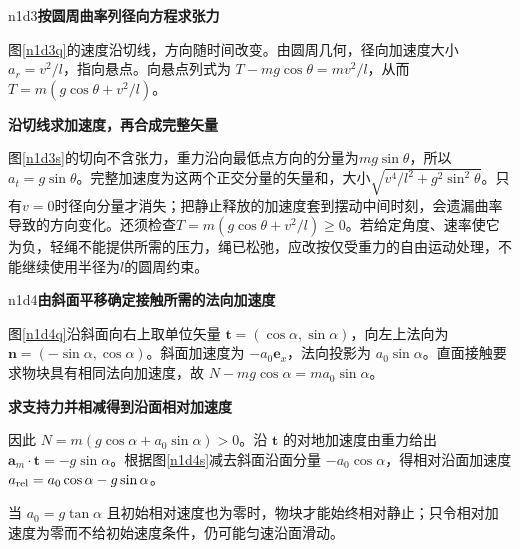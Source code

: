 \begin{drillsolution}{n1d3}\textbf{按圆周曲率列径向方程求张力}\par\nobreak
图\ref{n1d3q}的速度沿切线，方向随时间改变。由圆周几何，径向加速度大小 $a_r=v^2/l$，指向悬点。向悬点列式为 $T-mg\cos\theta=mv^2/l$，从而 $T=m(g\cos\theta+v^2/l)$。


\par\medskip{}\noindent\textbf{沿切线求加速度，再合成完整矢量}\par\nobreak
图\ref{n1d3s}的切向不含张力，重力沿向最低点方向的分量为$mg\sin\theta$，所以$a_t=g\sin\theta$。完整加速度为这两个正交分量的矢量和，大小$\sqrt{v^4/l^2+g^2\sin^2\theta}$。只有$v=0$时径向分量才消失；把静止释放的加速度套到摆动中间时刻，会遗漏曲率导致的方向变化。还须检查$T=m(g\cos\theta+v^2/l)\ge0$。若给定角度、速率使它为负，轻绳不能提供所需的压力，绳已松弛，应改按仅受重力的自由运动处理，不能继续使用半径为$l$的圆周约束。
\end{drillsolution}

\begin{drillsolution}{n1d4}\textbf{由斜面平移确定接触所需的法向加速度}\par\nobreak
图\ref{n1d4q}沿斜面向右上取单位矢量 $\bm t=(\cos\alpha,\sin\alpha)$，向左上法向为 $\bm n=(-\sin\alpha,\cos\alpha)$。斜面加速度为 $-a_0\bm e_x$，法向投影为 $a_0\sin\alpha$。直面接触要求物块具有相同法向加速度，故 $N-mg\cos\alpha=ma_0\sin\alpha$。


\par\medskip{}\noindent\textbf{求支持力并相减得到沿面相对加速度}\par\nobreak
因此 $N=m(g\cos\alpha+a_0\sin\alpha)>0$。沿 $\bm t$ 的对地加速度由重力给出 $\bm a_m\cdot\bm t=-g\sin\alpha$。根据图\ref{n1d4s}减去斜面沿面分量 $-a_0\cos\alpha$，得相对沿面加速度 $a_{\rm rel}=a_0\cos\alpha-g\sin\alpha$。

当 $a_0=g\tan\alpha$ 且初始相对速度也为零时，物块才能始终相对静止；只令相对加速度为零而不给初始速度条件，仍可能匀速沿面滑动。
\end{drillsolution}
